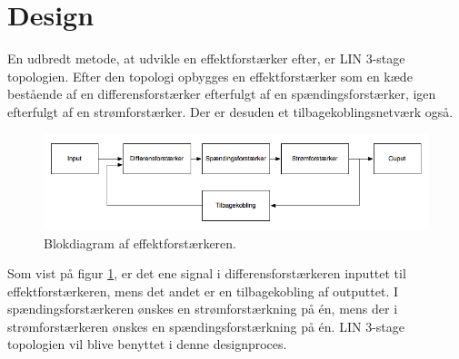 \section{Design}
En udbredt metode, at udvikle en effektforstærker efter, er LIN 3-stage topologien. Efter den topologi opbygges en effektforstærker som en kæde bestående af en differensforstærker efterfulgt af en spændingsforstærker, igen efterfulgt af en strømforstærker. Der er desuden et tilbagekoblingsnetværk også. 

\begin{figure}[h]
\centering
\includegraphics[scale=0.5]{teknisk/effektforstaerker/blokdiagram-effektforstaerker.png}
\caption{Blokdiagram af effektforstærkeren.}
\label{fig:lin_effektforstaerker}
\end{figure}

Som vist på figur \ref{fig:lin_effektforstaerker}, er det ene signal i differensforstærkeren inputtet til effektforstærkeren, mens det andet er en tilbagekobling af outputtet. I spændingsforstærkeren ønskes en strømforstærkning på én, mens der i strømforstærkeren ønskes en spændingsforstærkning på én. LIN 3-stage topologien vil blive benyttet i denne designproces. 